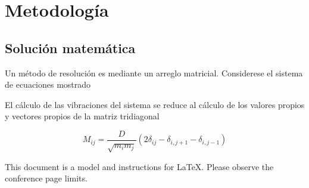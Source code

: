 \section{Metodología}
\subsection{Solución matemática}

Un método de resolución es mediante un arreglo matricial. Considerese el sistema de ecuaciones mostrado 

El cálculo de las vibraciones del sistema se reduce al cálculo de los valores propios y vectores propios de la matriz tridiagonal

\begin{equation*}
	M_{ij} = \frac{D}{\sqrt{m_i m_j}} (2 \delta_{ij} - \delta_{i, j+1} - \delta_{i, j-1}) 
\end{equation*}

This document is a model and instructions for \LaTeX.
Please observe the conference page limits. 